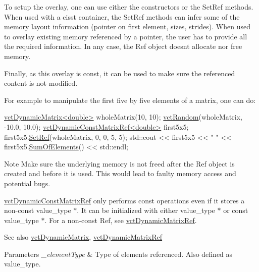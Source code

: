 To setup the overlay, one can use either the constructors or the Set\+Ref methods. When used with a cisst container, the Set\+Ref methods can infer some of the memory layout information (pointer on first element, sizes, strides). When used to overlay existing memory referenced by a pointer, the user has to provide all the required information. In any case, the Ref object doesn\textquotesingle{}t allocate nor free memory.

Finally, as this overlay is const, it can be used to make sure the referenced content is not modified.

For example to manipulate the first five by five elements of a matrix, one can do\+: 
\begin{DoxyCode}
\hyperlink{classvct_dynamic_matrix}{vctDynamicMatrix<double>} wholeMatrix(10, 10);
\hyperlink{group__cisst_vector_ga0d25660a2dc6ef9c093f6f6b2804d2d0}{vctRandom}(wholeMatrix, -10.0, 10.0);
\hyperlink{classvct_dynamic_const_matrix_ref}{vctDynamicConstMatrixRef<double>} first5x5;
first5x5.\hyperlink{classvct_dynamic_const_matrix_ref_a5f4c43a9600e4cf979d3daf0a466443a}{SetRef}(wholeMatrix, 0, 0, 5, 5);
std::cout << first5x5 << \textcolor{stringliteral}{" "} << first5x5.\hyperlink{classvct_dynamic_const_matrix_base_a134c1b6991bafceabe7bb6baa08e05b9}{SumOfElements}() << std::endl;
\end{DoxyCode}


\begin{DoxyNote}{Note}
Make sure the underlying memory is not freed after the Ref object is created and before it is used. This would lead to faulty memory access and potential bugs.

\hyperlink{classvct_dynamic_const_matrix_ref}{vct\+Dynamic\+Const\+Matrix\+Ref} only performs const operations even if it stores a non-\/const {\ttfamily value\+\_\+type $\ast$}. It can be initialized with either {\ttfamily value\+\_\+type $\ast$} or {\ttfamily const value\+\_\+type $\ast$}. For a non-\/const Ref, see \hyperlink{classvct_dynamic_matrix_ref}{vct\+Dynamic\+Matrix\+Ref}.
\end{DoxyNote}
\begin{DoxySeeAlso}{See also}
\hyperlink{classvct_dynamic_matrix}{vct\+Dynamic\+Matrix}, \hyperlink{classvct_dynamic_matrix_ref}{vct\+Dynamic\+Matrix\+Ref}
\end{DoxySeeAlso}

\begin{DoxyParams}{Parameters}
{\em \+\_\+element\+Type} & Type of elements referenced. Also defined as {\ttfamily value\+\_\+type}. \\
\hline
\end{DoxyParams}



